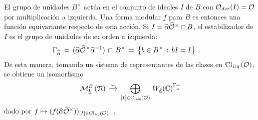 El grupo de unidades $B^{\times}$ act\'{u}a en el conjunto de ideales
$I$ de $B$ con $\mathcal{O}_{\mathit{der}}(I)=\mathcal{O}$ por multiplicaci\'{o}n a izquierda.
Una forma modular $f$ para $B$ es entonces una funci\'{o}n equivariante
respecto de esta acci\'{o}n. Si $I=\widehat{\alpha}\widehat{\mathcal{O}}^{\times}\cap B$,
el estabilizador de $I$ es el grupo de unidades de su orden a izquierda:
\begin{align*}
	\Gamma_{\widehat{\alpha}} & \,=\,
		(\widehat{\alpha}\widehat{\mathcal{O}}^{\times}\widehat{\alpha}^{-1})
			\,\cap\,B^{\times}
		\,=\, \left\lbrace b\in B^{\times} \,:\, bI=I \right\rbrace
	\text{ .}
\end{align*}
%
De esta manera, tomando un sistema de representantes de las clases en
$\mathrm{Cl}_{\mathit{izq}}\left(\mathcal{O}\right)$, se obtiene un isomorfismo
\begin{equation}
	\label{eq:descomposicionmodularesdefinida}
	\modularH[B]{k}{\frak{N}}\,\xrightarrow{\sim}\,
		\bigoplus_{[I]\in\lClass{\cal{O}}}\,
			W_{\peso{k}}(\bb{C})^{\Gamma_{\hhat{\alpha}}} \\
\end{equation}
%
dado por
\begin{math}
	f \mapsto(f(\widehat{\alpha}\widehat{\mathcal{O}}^{\times}))_{[I]\in\mathrm{Cl}_{\mathit{izq}}\left(\mathcal{O}\right)}
\end{math}~.
%


